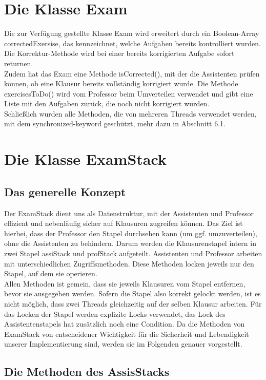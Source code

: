 \documentclass[12pt,a4paper]{article}
\begin{document}
\newpage
\section{Die Klasse Exam}

Die zur Verfügung gestellte Klasse Exam wird erweitert durch ein Boolean-Array correctedExersise, das kennzeichnet, welche Aufgaben bereits kontrolliert wurden. Die Korrektur-Methode wird bei einer bereits korrigierten Aufgabe sofort returnen.\\ Zudem hat das Exam eine Methode isCorrected(), mit der die Assistenten prüfen können, ob eine Klausur bereits vollständig korrigiert wurde. Die Methode exercisesToDo() wird vom Professor beim Umverteilen verwendet und gibt eine Liste mit den Aufgaben zurück, die noch nicht korrigiert wurden.\\
Schließlich wurden alle Methoden, die von mehreren Threads verwendet werden, mit dem synchronized-keyword geschützt, mehr dazu in Abschnitt 6.1.


\newpage
\section{Die Klasse ExamStack}
\subsection{Das generelle Konzept}
Der ExamStack dient uns als Datenstruktur, mit der Assistenten und Professor effizient und nebenläufig sicher auf Klausuren zugreifen können. Das Ziel ist hierbei, dass der Professor den Stapel durchsehen kann (um ggf. umzuverteilen), ohne die Assistenten zu behindern. Darum werden die Klausurenstapel intern in zwei Stapel assiStack und profStack aufgeteilt. Assistenten und Professor arbeiten mit unterschiedlichen Zugriffsmethoden. Diese Methoden locken jeweils nur den Stapel, auf dem sie operieren.\\
Allen Methoden ist gemein, dass sie jeweils Klausuren vom Stapel entfernen, bevor sie ausgegeben werden. Sofern die Stapel also korrekt gelockt werden, ist es nicht möglich, dass zwei Threads gleichzeitig auf der selben Klausur arbeiten. Für das Locken der Stapel werden explizite Locks verwendet, das Lock des Assistentenstapels hat zusätzlich noch eine Condition.
Da die Methoden von ExamStack von entscheidener Wichtigkeit für die Sicherheit und Lebendigkeit unserer Implementierung sind, werden sie im Folgenden genauer vorgestellt.

\subsection{Die Methoden des AssisStacks}
\end{document}
